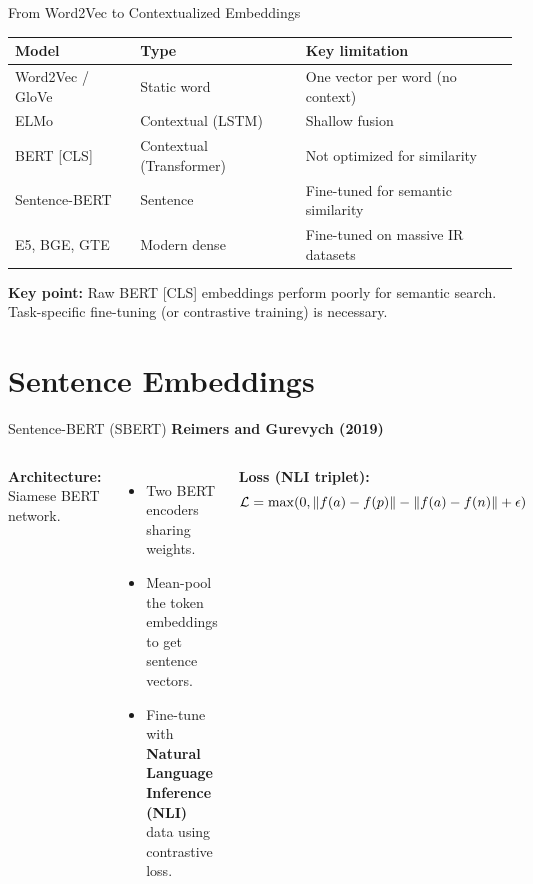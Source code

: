 \documentclass[aspectratio=169,10pt]{beamer}
\begin{document}
\begin{frame}{From Word2Vec to Contextualized Embeddings}
  \begin{center}
  \begin{tabular}{lll}
    \toprule
    \textbf{Model} & \textbf{Type} & \textbf{Key limitation} \\
    \midrule
    Word2Vec / GloVe & Static word & One vector per word (no context) \\
    ELMo & Contextual (LSTM) & Shallow fusion \\
    BERT [CLS] & Contextual (Transformer) & Not optimized for similarity \\
    Sentence-BERT & Sentence & Fine-tuned for semantic similarity \\
    E5, BGE, GTE & Modern dense & Fine-tuned on massive IR datasets \\
    \bottomrule
  \end{tabular}
  \end{center}
  \vspace{0.4em}
  \textbf{Key point:} Raw BERT [CLS] embeddings perform poorly for semantic search.
  Task-specific fine-tuning (or contrastive training) is necessary.
\end{frame}

\section{Sentence Embeddings}

\begin{frame}{Sentence-BERT (SBERT)}
  \textbf{Reimers and Gurevych (2019)}~\cite{reimers2019sentence}
  \vspace{0.4em}
  \begin{columns}[T]
      \textbf{Architecture:} Siamese BERT network.
      \begin{itemize}
        \item Two BERT encoders sharing weights.
        \item Mean-pool the token embeddings to get sentence vectors.
        \item Fine-tune with \textbf{Natural Language Inference (NLI)} data using contrastive loss.
      \end{itemize}
      \vspace{0.3em}
      \textbf{Loss (NLI triplet):}
      \[
        \mathcal{L} = \max(0, \left\lVert f(a) - f(p) \right\rVert - \left\lVert f(a) - f(n) \right\rVert + \epsilon)
      \]
  \end{columns}
\end{frame}
\end{document}
